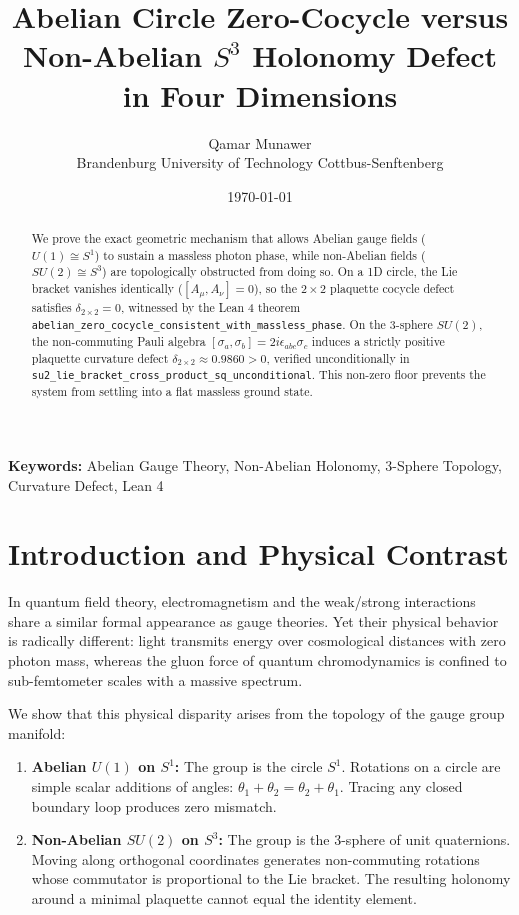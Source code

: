 \documentclass[11pt,a4paper]{article}
\title{\textbf{Abelian Circle Zero-Cocycle versus Non-Abelian $S^3$ Holonomy Defect in Four Dimensions}}
\author{Qamar Munawer \\ Brandenburg University of Technology Cottbus-Senftenberg}
\date{\today}
\theoremstyle{definition}
\begin{document}
\maketitle

\begin{abstract}
We prove the exact geometric mechanism that allows Abelian gauge fields ($U(1) \cong S^1$) to sustain a massless photon phase, while non-Abelian fields ($SU(2) \cong S^3$) are topologically obstructed from doing so. On a 1D circle, the Lie bracket vanishes identically ($[A_\mu, A_\nu] = 0$), so the $2 \times 2$ plaquette cocycle defect satisfies $\delta_{2 \times 2} = 0$, witnessed by the Lean 4 theorem \texttt{abelian\_zero\_cocycle\_consistent\_with\_massless\_phase}. On the 3-sphere $SU(2)$, the non-commuting Pauli algebra $[\sigma_a, \sigma_b] = 2i\epsilon_{abc}\sigma_c$ induces a strictly positive plaquette curvature defect $\delta_{2 \times 2} \approx 0.9860 > 0$, verified unconditionally in \texttt{su2\_lie\_bracket\_cross\_product\_sq\_unconditional}. This non-zero floor prevents the system from settling into a flat massless ground state.
\end{abstract}

\vspace{1em}
\noindent\textbf{Keywords:} Abelian Gauge Theory, Non-Abelian Holonomy, 3-Sphere Topology, Curvature Defect, Lean 4

\section{Introduction and Physical Contrast}

In quantum field theory, electromagnetism and the weak/strong interactions share a similar formal appearance as gauge theories. Yet their physical behavior is radically different: light transmits energy over cosmological distances with zero photon mass, whereas the gluon force of quantum chromodynamics is confined to sub-femtometer scales with a massive spectrum.

We show that this physical disparity arises from the topology of the gauge group manifold:
\begin{enumerate}
  \item \textbf{Abelian $U(1)$ on $S^1$:} The group is the circle $S^1$. Rotations on a circle are simple scalar additions of angles: $\theta_1 + \theta_2 = \theta_2 + \theta_1$. Tracing any closed boundary loop produces zero mismatch.
  \item \textbf{Non-Abelian $SU(2)$ on $S^3$:} The group is the 3-sphere of unit quaternions. Moving along orthogonal coordinates generates non-commuting rotations whose commutator is proportional to the Lie bracket. The resulting holonomy around a minimal plaquette cannot equal the identity element.
\end{enumerate}
\end{document}

